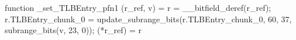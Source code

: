 function _set_TLBEntry_pfn1 (r_ref, v) = {
    r = __bitfield_deref(r_ref);
    r.TLBEntry_chunk_0 = update_subrange_bits(r.TLBEntry_chunk_0, 60, 37, subrange_bits(v, 23, 0));
    (*r_ref) = r
}
